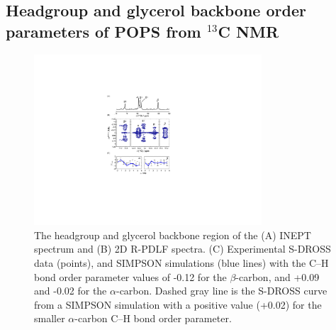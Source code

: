 \documentclass[aps,prl,superscriptaddress,twocolumn]{revtex4}
\begin{document}
\subsection{Headgroup and glycerol backbone order parameters of POPS from $^{13}$C NMR}

\begin{figure}[!tb]
  \centering
  \includegraphics[width=8.5cm]{../Figs/fig1_POPS.pdf}
  \caption{\label{PShgSIGNSsimpson}
    The headgroup and glycerol backbone region of the (A) INEPT spectrum and
    (B) 2D R-PDLF spectra.
    (C) Experimental S-DROSS data (points), and SIMPSON simulations (blue lines) with
    the C--H bond order parameter values of -0.12 for the $\beta$-carbon, and +0.09 and -0.02
    for the $\alpha$-carbon.
    Dashed gray line is the S-DROSS curve from a SIMPSON simulation with a positive value (+0.02) 
    for the smaller $\alpha$-carbon C--H bond order parameter.
  }
\end{figure}
\end{document}
